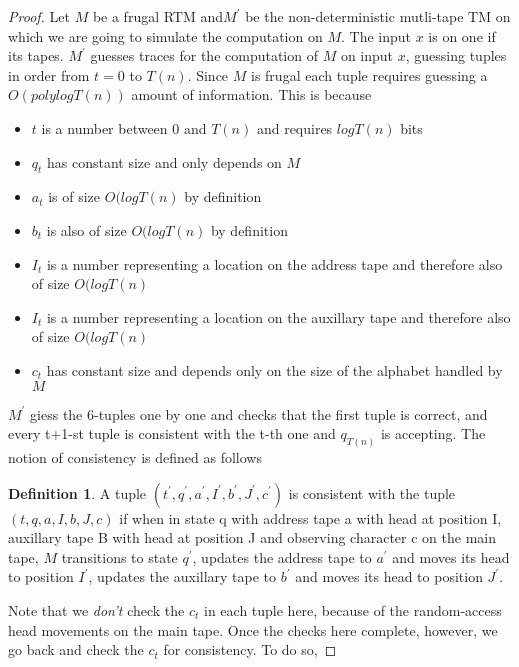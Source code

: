 \documentclass[english]{article}
\theoremstyle{plain}
\theoremstyle{definition}
\newtheorem{defn}[thm]{Definition}
\theoremstyle{plain}
\begin{document}
\begin{proof}
  Let $M$ be a frugal RTM and$M^{'}$ be the non-deterministic
  mutli-tape TM on which we are going to simulate the computation on
  $M$. The input $x$ is on one if its tapes. $M^{'}$ guesses traces
  for the computation of $M$ on input $x$, guessing tuples in order
  from $t = 0$ to $T(n)$. Since $M$ is frugal each tuple requires
  guessing a $O(polylog T(n))$ amount of information. This is because

  \begin{itemize}
  \item $t$ is a number between $0$ and $T(n)$ and requires $log T(n)$
    bits
  \item $q_t$ has constant size and only depends on $M$
  \item $a_t$ is of size $O(log T(n)$ by definition
  \item $b_t$ is also of size $O(log T(n)$ by definition
  \item $I_t$ is a number representing a location on the address tape
    and therefore also of size $O(log T(n)$
  \item $I_t$ is a number representing a location on the auxillary tape
    and therefore also of size $O(log T(n)$
  \item $c_t$ has constant size and depends only on the size of the
    alphabet handled by $M$
  \end{itemize}

  $M^{'}$ giess the 6-tuples one by one and checks that the first tuple
  is correct, and every t+1-st tuple is consistent with the t-th one and
  $q_{T(n)}$ is accepting. The notion of consistency is defined as
  follows

  \begin{defn}
    A tuple $(t^{'}, q^{'}, a^{'}, I^{'}, b^{'}, J^{'}, c^{'})$ is
    consistent with the tuple $(t, q, a, I, b, J, c)$ if when in state q
    with address tape a with head at position I, auxillary tape B with
    head at position J and observing character c on the main tape, $M$
    transitions to state $q^{'}$, updates the address tape to $a^{'}$
    and moves its head to position $I^{'}$, updates the auxillary tape
    to $b^{'}$ and moves its head to position $J^{'}$.
  \end{defn}

  Note that we \emph{don't} check the $c_{t}$ in each tuple here,
  because of the random-access head movements on the main tape. Once the
  checks here complete, however, we go back and check the $c_{t}$ for
  consistency. To do so,


\end{proof}
\end{document}
